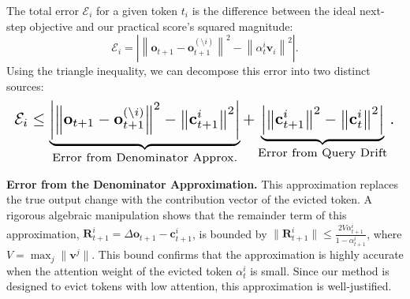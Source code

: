 The total error \( \mathcal{E}_i \) for a given token \( t_i \) is the difference between the ideal next-step objective and our practical score's squared magnitude:
\begin{equation}
\mathcal{E}_i = \left| \left\| \mathbf{o}_{t+1} - \mathbf{o}_{t+1}^{(\setminus i)} \right\|^2 - \left\| \alpha_{t}^i\mathbf{v}_i \right\|^2 \right|.
\end{equation}
Using the triangle inequality, we can decompose this error into two distinct sources:
\begin{equation}
\resizebox{\columnwidth}{!}{$
\mathcal{E}_i \le \underbrace{\left| \left\| \mathbf{o}_{t+1} - \mathbf{o}_{t+1}^{(\setminus i)} \right\|^2 - \left\| \mathbf{c}_{t+1}^i \right\|^2 \right|}_{\text{Error from Denominator Approx.}} + \underbrace{\left| \left\| \mathbf{c}_{t+1}^i \right\|^2 - \left\| \mathbf{c}_{t}^i \right\|^2 \right|}_{\text{Error from Query Drift}}.
$}
\end{equation}


\noindent\textbf{Error from the Denominator Approximation.}
This approximation replaces the true output change with the contribution vector of the evicted token. A rigorous algebraic manipulation shows that the remainder term of this approximation, \( \mathbf{R}_{t+1}^i = \Delta\mathbf{o}_{t+1} - \mathbf{c}_{t+1}^i \), is bounded by \( \|\mathbf{R}_{t+1}^i\| \le \frac{2V\alpha_{t+1}^i}{1-\alpha_{t+1}^i} \), where \(V = \max_j\|\mathbf{v}^j\|\). This bound confirms that the approximation is highly accurate when the attention weight of the evicted token \( \alpha_t^i \) is small. Since our method is designed to evict tokens with low attention, this approximation is well-justified.

